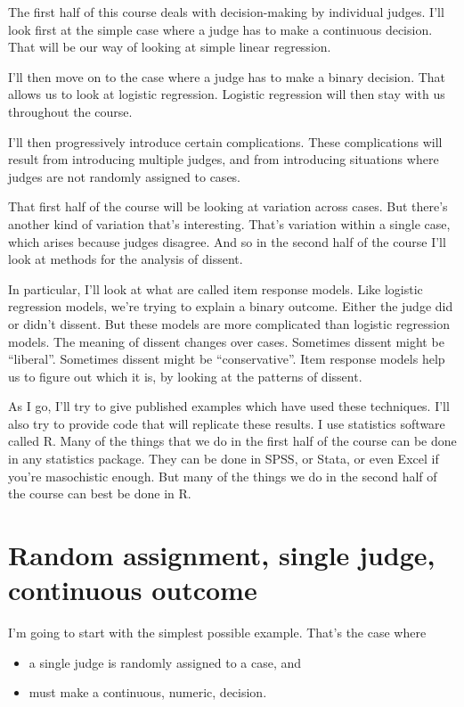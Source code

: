 \documentclass[12pt,twoside]{article}
\providecommand{\tightlist}{%
  \setlength{\itemsep}{0pt}\setlength{\parskip}{0pt}}
\begin{document}
The first half of this course deals with decision-making by individual
judges. I'll look first at the simple case where a judge has to make a
continuous decision. That will be our way of looking at simple linear
regression.

I'll then move on to the case where a judge has to make a binary
decision. That allows us to look at logistic regression. Logistic
regression will then stay with us throughout the course.

I'll then progressively introduce certain complications. These
complications will result from introducing multiple judges, and from
introducing situations where judges are not randomly assigned to cases.

That first half of the course will be looking at variation across cases.
But there's another kind of variation that's interesting. That's
variation within a single case, which arises because judges disagree.
And so in the second half of the course I'll look at methods for the
analysis of dissent.

In particular, I'll look at what are called item response models. Like
logistic regression models, we're trying to explain a binary outcome.
Either the judge did or didn't dissent. But these models are more
complicated than logistic regression models. The meaning of dissent
changes over cases. Sometimes dissent might be ``liberal''. Sometimes
dissent might be ``conservative''. Item response models help us to
figure out which it is, by looking at the patterns of dissent.

As I go, I'll try to give published examples which have used these
techniques. I'll also try to provide code that will replicate these
results. I use statistics software called R. Many of the things that we
do in the first half of the course can be done in any statistics
package. They can be done in SPSS, or Stata, or even Excel if you're
masochistic enough. But many of the things we do in the second half of
the course can best be done in R.

\section{Random assignment, single judge, continuous
outcome}\label{random-assignment-single-judge-continuous-outcome}

I'm going to start with the simplest possible example. That's the case
where

\begin{itemize}
\tightlist
\item
  a single judge is randomly assigned to a case, and
\item
  must make a continuous, numeric, decision.
\end{itemize}
\end{document}
